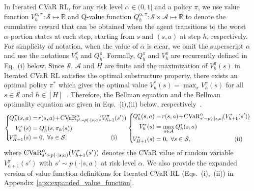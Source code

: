 \documentclass{article} %
\newcommand{\R}{\mathbb{R}}
\newcommand{\cA}{\mathcal{A}}
\newcommand{\cS}{\mathcal{S}}
\newcommand{\cvar}{\textup{CVaR}}
\newcommand{\revision}[1]{{\color{black} #1}}
\newcommand{\longbo}[1]{}
\newcommand{\yihan}[1]{}
\newcommand{\longbo}[1]{{\color{red}  [\text{Longbo:} #1]}}
\newcommand{\yihan}[1]{{\color{teal} [\text{Yihan:} #1]}}
\begin{document}
	
	In Iterated CVaR RL, for any risk level $\alpha \in (0,1]$ and a policy $\pi$, we use value function $V^{\alpha,\pi}_h:\cS \mapsto \R$ and Q-value function $Q^{\alpha,\pi}_h:\cS \times \cA \mapsto \R$ to denote the cumulative reward that can be obtained when 
	the agent transitions to the worst $\alpha$-portion states at each step, starting from $s$ and $(s,a)$ at step $h$, respectively. 
	For simplicity of notation, when the value of $\alpha$ is clear, we omit the superscript $\alpha$ and use the notations $V^{\pi}_h$ and $Q^{\pi}_h$. 
	Formally, $Q^{\pi}_h$ and $V^{\pi}_h$ are recurrently defined in Eq.~(i) below.  %
	Since $\cS$, $\cA$ and $H$ are finite and the maximization of $V^{\pi}_h(s)$ in Iterated CVaR RL satisfies the optimal substructure property, there exists an optimal policy $\pi^{*}$ which gives the optimal value $V^{*}_h(s)=\max_{\pi} V^{\pi}_h(s)$ for all $s \in \cS$ and $h \in [H]$~\citep{chu2014markov}. 
	Therefore, the Bellman equation and the Bellman optimality equation are given in Eqs.~(i),(ii) below, respectively~\citep{chu2014markov}. %
	\begin{equation*}
		\left\{
		\begin{aligned}
			\! Q^{\pi}_h(s,a)& =\! r(s,a) \!+\! \cvar^{\alpha}_{s' \sim p(\cdot|s,a)}\!(V^{\pi}_{h+1}(s'))
			\\
			\! V^{\pi}_h(s)&=Q^{\pi}_h(s,\pi_h(s))
			\\
			\! V^{\pi}_{H+1}(s)&=0, \ \forall s \in \cS ,\hspace*{7em} \textup{(i)}
		\end{aligned}
		\right. 
		\left\{
		\begin{aligned}
			\! Q^{*}_h(s,a) &=\! r(s,a) \!+\! \cvar^{\alpha}_{s' \sim p(\cdot|s,a)}\!(V^{*}_{h+1}(s'))
			\\
			\! V^{*}_h(s)&= \max_{a \in \cA} Q^{*}_h(s,a)
			\\
			\! V^{*}_{H+1}(s)&=0, \ \forall s \in \cS ,\hspace*{7em} \textup{(ii)}
		\end{aligned}
		\right. 
	\end{equation*}
	where $\cvar^{\alpha}_{s' \sim p(\cdot|s,a)}(V^{\pi}_{h+1}(s'))$ denotes the CVaR value of random variable $V^{\pi}_{h+1}(s')$ with $s' \sim p(\cdot|s,a)$ at risk level $\alpha$. \revision{We also provide the expanded version of value function definitions for Iterated CVaR RL (Eqs.~(i),~(ii)) in Appendix~\ref{apx:expanded_value_function}.}
	
\end{document}
